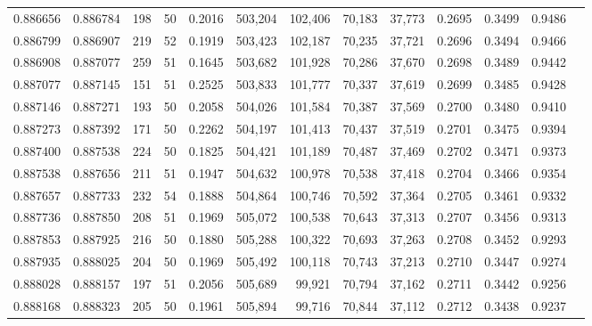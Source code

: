 \begin{tabular}{rrrrrrrrrrrrr}
0.886656 & 0.886784 &   198 &  50 &                                     0.2016 & 503,204 & 102,406 &  70,183 &  37,773 & 0.2695 & 0.3499 & 0.9486 \\
0.886799 & 0.886907 &   219 &  52 &                                     0.1919 & 503,423 & 102,187 &  70,235 &  37,721 & 0.2696 & 0.3494 & 0.9466 \\
0.886908 & 0.887077 &   259 &  51 &                                     0.1645 & 503,682 & 101,928 &  70,286 &  37,670 & 0.2698 & 0.3489 & 0.9442 \\
0.887077 & 0.887145 &   151 &  51 &                                     0.2525 & 503,833 & 101,777 &  70,337 &  37,619 & 0.2699 & 0.3485 & 0.9428 \\
0.887146 & 0.887271 &   193 &  50 &                                     0.2058 & 504,026 & 101,584 &  70,387 &  37,569 & 0.2700 & 0.3480 & 0.9410 \\
0.887273 & 0.887392 &   171 &  50 &                                     0.2262 & 504,197 & 101,413 &  70,437 &  37,519 & 0.2701 & 0.3475 & 0.9394 \\
0.887400 & 0.887538 &   224 &  50 &                                     0.1825 & 504,421 & 101,189 &  70,487 &  37,469 & 0.2702 & 0.3471 & 0.9373 \\
0.887538 & 0.887656 &   211 &  51 &                                     0.1947 & 504,632 & 100,978 &  70,538 &  37,418 & 0.2704 & 0.3466 & 0.9354 \\
0.887657 & 0.887733 &   232 &  54 &                                     0.1888 & 504,864 & 100,746 &  70,592 &  37,364 & 0.2705 & 0.3461 & 0.9332 \\
0.887736 & 0.887850 &   208 &  51 &                                     0.1969 & 505,072 & 100,538 &  70,643 &  37,313 & 0.2707 & 0.3456 & 0.9313 \\
0.887853 & 0.887925 &   216 &  50 &                                     0.1880 & 505,288 & 100,322 &  70,693 &  37,263 & 0.2708 & 0.3452 & 0.9293 \\
0.887935 & 0.888025 &   204 &  50 &                                     0.1969 & 505,492 & 100,118 &  70,743 &  37,213 & 0.2710 & 0.3447 & 0.9274 \\
0.888028 & 0.888157 &   197 &  51 &                                     0.2056 & 505,689 &  99,921 &  70,794 &  37,162 & 0.2711 & 0.3442 & 0.9256 \\
0.888168 & 0.888323 &   205 &  50 &                                     0.1961 & 505,894 &  99,716 &  70,844 &  37,112 & 0.2712 & 0.3438 & 0.9237 \\

\end{tabular}

